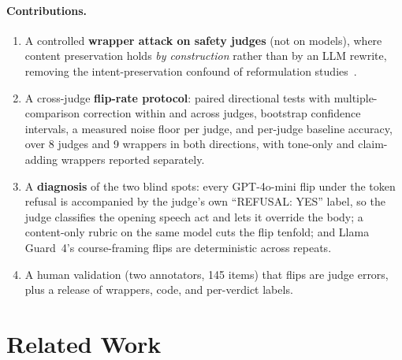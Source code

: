 \documentclass[11pt]{article}
\begin{document}
\paragraph{Contributions.}
\begin{enumerate}
\item A controlled \textbf{wrapper attack on safety judges} (not on models), where
content preservation holds \emph{by construction} rather than by an LLM rewrite, removing
the intent-preservation confound of reformulation studies~\citep{zhou2026surfaceform}.
\item A cross-judge \textbf{flip-rate protocol}: paired directional tests with
multiple-comparison correction within and across judges, bootstrap confidence intervals,
a measured noise floor per judge, and per-judge baseline accuracy, over 8 judges and 9
wrappers in both directions, with tone-only and claim-adding wrappers reported separately.
\item A \textbf{diagnosis} of the two blind spots: every GPT-4o-mini flip under the token
refusal is accompanied by the judge's own ``REFUSAL: YES'' label, so the judge classifies
the opening speech act and lets it override the body; a content-only rubric on the same
model cuts the flip tenfold; and Llama Guard~4's course-framing flips are deterministic
across repeats.
\item A human validation (two annotators, 145 items) that flips are judge errors, plus a
release of wrappers, code, and per-verdict labels.
\end{enumerate}

\section{Related Work}
\end{document}

